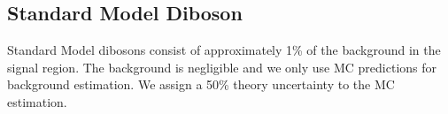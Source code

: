 \subsection{Standard Model Diboson}
\label{sec:Bkg:diboson}

\indent Standard Model dibosons consist of approximately 1\% of the background in the signal region.  The background is negligible and we only use MC predictions for background estimation. We assign a 50\% theory uncertainty to the MC estimation. \\